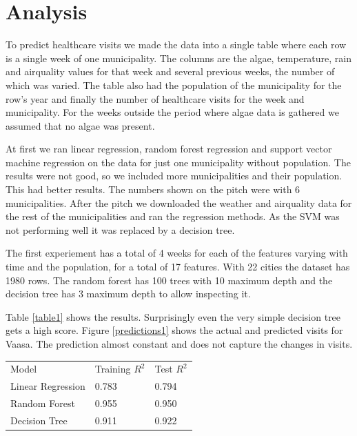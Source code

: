 \documentclass[a4paper, 12pt, english]{article}
\begin{document}
\section{Analysis}
To predict healthcare visits we made the data into a
single table where each row is a single week of one
municipality. The columns are the algae, temperature,
rain and airquality values for that week and several
previous weeks, the number of which was varied.
The table also had the population of the municipality
for the row's year and finally the number of healthcare
visits for the week and municipality.
For the weeks outside the period where algae data
is gathered we assumed that no algae was present.

At first we ran linear regression, random forest regression
and support vector machine regression on the data for just
one municipality without population. The results were not good,
so we included more municipalities and their population.
This had better results. The numbers shown on the
pitch were with 6 municipalities. After the pitch we
downloaded the weather and airquality data for
the rest of the municipalities and ran the regression
methods. As the SVM was not performing well it was
replaced by a decision tree.

The first experiement has a total of 4 weeks for
each of the features varying with time and the
population, for a total of
17 features. With 22 cities the dataset has 1980 rows.
The random forest has 100 trees with 10 maximum depth
and the decision tree has 3 maximum depth to allow
inspecting it.

Table \ref{table1} shows the results.
Surprisingly even the very simple decision tree
gets a high score. Figure \ref{predictions1} shows
the actual and predicted visits for Vaasa.
The prediction almost constant and does not capture
the changes in visits.

\begin{center}
\begin{tabular}{l l l}
Model & Training \(R^2\) & Test \(R^2\) \\
Linear Regression & 0.783 & 0.794 \\
Random Forest & 0.955 & 0.950 \\
Decision Tree & 0.911 & 0.922 \\
\end{tabular}
\end{center}
\label{table1}
\end{document}
